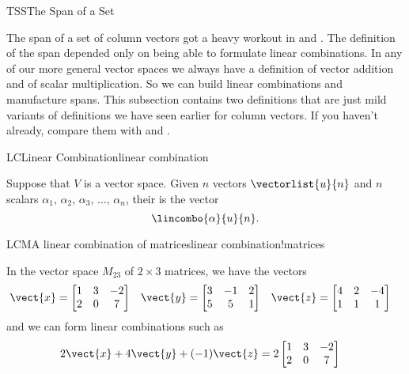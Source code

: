 %
\begin{subsect}{TSS}{The Span of a Set}
%
\begin{para}The span of a set of column vectors got a heavy workout in  and .  The definition of the span depended only on being able to formulate linear combinations.  In any of our more general vector spaces we always have a definition of vector addition and of scalar multiplication.  So we can build linear combinations and manufacture spans.  This subsection contains two definitions that are just mild variants of definitions we have seen earlier for column vectors.  If you haven't already, compare them with  and  .\end{para}
%
\begin{definition}{LC}{Linear Combination}{linear combination}
\begin{para}Suppose that $V$ is a vector space.
Given $n$ vectors $\vectorlist{u}{n}$ and $n$ scalars $\alpha_1,\,\alpha_2,\,\alpha_3,\,\ldots,\,\alpha_n$, their  is the vector
%
\begin{equation*}
\lincombo{\alpha}{u}{n}.
\end{equation*}
\end{para}
%
\end{definition}
%
\begin{example}{LCM}{A linear combination of matrices}{linear combination!matrices}
\begin{para}In the vector space $M_{23}$ of $2\times 3$ matrices, we have the vectors
%
\begin{align*}
\vect{x}&=
\begin{bmatrix}
1&3&-2\\
2&0&7
\end{bmatrix}
&
\vect{y}&=
\begin{bmatrix}
3&-1&2\\
5&5&1
\end{bmatrix}
&
\vect{z}&=
\begin{bmatrix}
4&2&-4\\
1&1&1
\end{bmatrix}
\end{align*}
%
and we can form linear combinations such as
%
\begin{align*}
2\vect{x}+4\vect{y}+(-1)\vect{z}&=
2
\begin{bmatrix}
1&3&-2\\
2&0&7
\end{bmatrix}

\end{align*}
\end{para}
\end{example}
\end{subsect}
